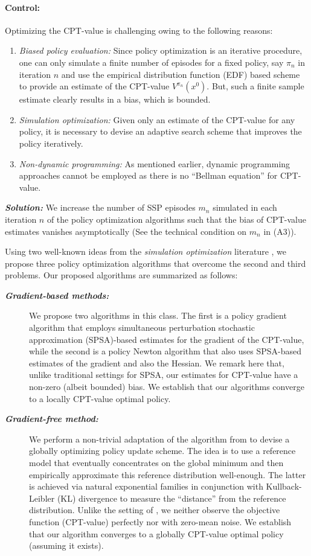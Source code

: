 \documentclass[11pt,letterpaper,english]{article}
\begin{document}
\paragraph{Control:} Optimizing the CPT-value is challenging owing to the following reasons:
\begin{enumerate}[\bfseries (i)]
\item \textit{Biased policy evaluation:} Since policy optimization is an iterative procedure, one can only simulate a finite number of episodes for a fixed policy, say $\pi_n$ in iteration $n$ and use the empirical distribution function (EDF) based scheme to provide an estimate of the CPT-value $V^{\pi_n}(x^0)$. But, such a finite sample estimate clearly results in a bias, which is bounded.
\item \textit{Simulation optimization:} Given only an estimate of the CPT-value for any policy, it is necessary to devise an adaptive search scheme that improves the policy iteratively. 
\item \textit{Non-dynamic programming:} As mentioned earlier, dynamic programming approaches cannot be employed as there is no ``Bellman equation'' for CPT-value.  
\end{enumerate}
\textit{\textbf{Solution:}} 
We increase the number of SSP episodes $m_n$ simulated in each iteration $n$ of the policy optimization algorithms such that the bias of CPT-value estimates vanishes asymptotically (See the technical condition on $m_n$ in (A3)).

Using two well-known ideas from the \textit{simulation optimization} literature \cite{fu2015handbook}, we propose three policy optimization algorithms that overcome the second and third problems. Our proposed algorithms are summarized as follows:
\begin{description}
\item[\textbf{\textit{Gradient-based methods:}}] We propose two algorithms in this class. The first is a policy gradient algorithm that employs simultaneous perturbation stochastic approximation (SPSA)-based estimates for the gradient of the CPT-value, while the second is a policy Newton algorithm that also uses SPSA-based estimates of the gradient and also the Hessian. We remark here that, unlike traditional settings for SPSA, our estimates for CPT-value have a non-zero (albeit bounded) bias. We establish that our algorithms converge to a locally CPT-value optimal policy. 
\item[\textbf{\textit{Gradient-free method:}}] We perform a non-trivial adaptation of the algorithm from \cite{chang2013simulation} to devise a globally optimizing policy update scheme. The idea is to use a reference model that eventually concentrates on the global minimum and then empirically approximate this reference distribution well-enough. The latter is achieved via natural exponential families in conjunction with Kullback-Leibler (KL) divergence to measure the ``distance'' from the reference distribution. Unlike the setting of \cite{chang2013simulation}, we neither observe the objective function (CPT-value) perfectly nor with zero-mean noise. We establish that our algorithm converges to a globally CPT-value optimal policy (assuming it exists).
\end{description}
\end{document}

